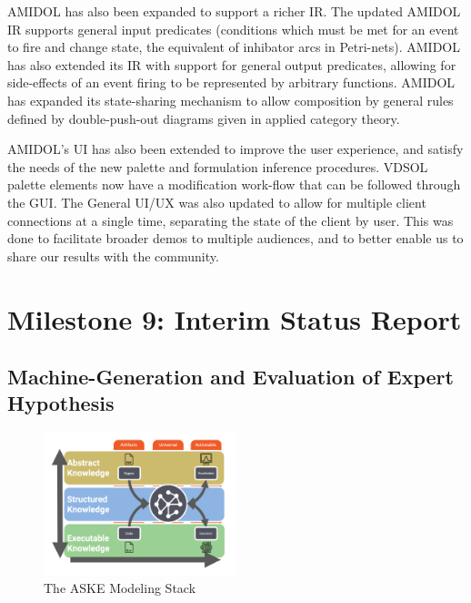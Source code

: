 \documentclass[12pt]{galois-whitepaper}
\begin{document}
AMIDOL has also been expanded to support a richer IR.  The updated
AMIDOL IR supports general input predicates (conditions which must be
met for an event to fire and change state, the equivalent of inhibator
arcs in Petri-nets).  AMIDOL has also extended its IR with support for
general output predicates, allowing for side-effects of an event
firing to be represented by arbitrary functions.  AMIDOL has expanded
its state-sharing mechanism to allow composition by general rules
defined by double-push-out diagrams given in applied category theory.

AMIDOL's UI has also been extended to improve the user experience, and
satisfy the needs of the new palette and formulation inference
procedures.  VDSOL palette elements now have a modification work-flow
that can be followed through the GUI.  The General UI/UX was also
updated to allow for multiple client connections at a single time,
separating the state of the client by user.  This was done to
facilitate broader demos to multiple audiences, and to better enable
us to share our results with the community.

  \section{Milestone 9: Interim Status Report}

  \subsection{Machine-Generation and Evaluation of Expert Hypothesis}

  \begin{figure}
    \centering
    \includegraphics[width=0.5\textwidth]{knowledgespider.png}
    \caption{The ASKE Modeling Stack}
    \label{Fig:Stack}
  \end{figure}
  
\end{document}
